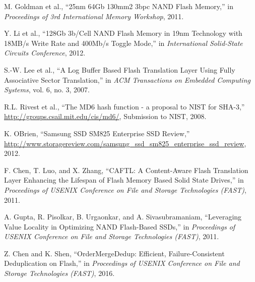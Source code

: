 \begin{thebibliography}{00}
M. Goldman et al.,
``25nm 64Gb 130mm2 3bpc NAND Flash Memory,''
in \textit{Proceedings of 3rd International Memory Workshop}, 2011.


Y. Li et al.,
``128Gb 3b/Cell NAND Flash Memory in 19nm Technology with 18MB/s Write Rate and 400Mb/s Toggle Mode,''
in \textit{International Solid-State Circuits Conference}, 2012.


S.-W. Lee et al.,
``A Log Buffer Based Flash Translation Layer Using Fully Associative Sector Translation,''
in \textit{ACM Transactions on Embedded Computing Systems}, vol. 6, no. 3, 2007.


R.L. Rivest et al.,
``The MD6 hash function - a proposal to NIST for SHA-3,''
\url{http://groups.csail.mit.edu/cis/md6/}, Submission to NIST, 2008.

K. OBrien,
``Samsung SSD SM825 Enterprise SSD Review,''
\url{http://www.storagereview.com/samsung_ssd_sm825_enterprise_ssd_review}, 2012.

F. Chen, T. Luo, and X. Zhang, 
``CAFTL: A Content-Aware Flash Translation Layer Enhancing the Lifespan of Flash Memory Based Solid State Drives,''
in \textit{Proceedings of USENIX Conference on File and Storage Technologies (FAST)}, 2011.

A. Gupta, R. Pisolkar, B. Urgaonkar, and A. Sivasubramaniam,
``Leveraging Value Locality in Optimizing NAND Flash-Based SSDs,''
in \textit{Proceedings of USENIX Conference on File and Storage Technologies (FAST)}, 2011.

Z. Chen and K. Shen, 
``OrderMergeDedup: Efficient, Failure-Consistent Deduplication on Flash,'' 
in \textit{Proceedings of USENIX Conference on File and Storage Technologies (FAST)}, 2016.


\end{thebibliography}
